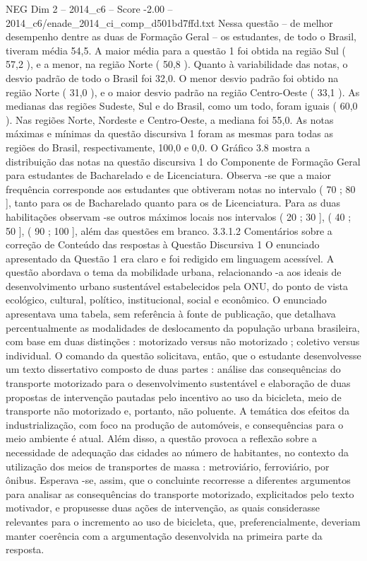 \begin{textsample}{NEG Dim 2 – 2014\_c6 – Score -2.00 – 2014\_c6/enade\_2014\_ci\_comp\_d501bd7ffd.txt}
Nessa questão – de melhor desempenho dentre as duas de Formação Geral – os estudantes, de todo o Brasil, tiveram média 54,5.
A maior média para a questão 1 foi obtida na região Sul ( 57,2 ), e a menor, na região Norte ( 50,8 ).
Quanto à variabilidade das notas, o desvio padrão de todo o Brasil foi 32,0.
O menor desvio padrão foi obtido na região Norte ( 31,0 ), e o maior desvio padrão na região Centro-Oeste ( 33,1 ).
As medianas das regiões Sudeste, Sul e do Brasil, como um todo, foram iguais ( 60,0 ).
Nas regiões Norte, Nordeste e Centro-Oeste, a mediana foi 55,0.
As notas máximas e mínimas da questão discursiva 1 foram as mesmas para todas as regiões do Brasil, respectivamente, 100,0 e 0,0.
O Gráfico 3.8 mostra a distribuição das notas na questão discursiva 1 do Componente de Formação Geral para estudantes de Bacharelado e de Licenciatura.
Observa -se que a maior frequência corresponde aos estudantes que obtiveram notas no intervalo ( 70 ; 80 ], tanto para os de Bacharelado quanto para os de Licenciatura.
Para as duas habilitações observam -se outros máximos locais nos intervalos ( 20 ; 30 ], ( 40 ; 50 ], ( 90 ; 100 ], além das questões em branco. 3.3.1.2 Comentários sobre a correção de Conteúdo das respostas à Questão Discursiva 1 O enunciado apresentado da Questão 1 era claro e foi redigido em linguagem acessível.
A questão abordava o tema da mobilidade urbana, relacionando -a aos ideais de desenvolvimento urbano sustentável estabelecidos pela ONU, do ponto de vista ecológico, cultural, político, institucional, social e econômico.
O enunciado apresentava uma tabela, sem referência à fonte de publicação, que detalhava percentualmente as modalidades de deslocamento da população urbana brasileira, com base em duas distinções : motorizado versus não motorizado ; coletivo versus individual.
O comando da questão solicitava, então, que o estudante desenvolvesse um texto dissertativo composto de duas partes : análise das consequências do transporte motorizado para o desenvolvimento sustentável e elaboração de duas propostas de intervenção pautadas pelo incentivo ao uso da bicicleta, meio de transporte não motorizado e, portanto, não poluente.
A temática dos efeitos da industrialização, com foco na produção de automóveis, e consequências para o meio ambiente é atual.
Além disso, a questão provoca a reflexão sobre a necessidade de adequação das cidades ao número de habitantes, no contexto da utilização dos meios de transportes de massa : metroviário, ferroviário, por ônibus.
Esperava -se, assim, que o concluinte recorresse a diferentes argumentos para analisar as consequências do transporte motorizado, explicitados pelo texto motivador, e propusesse duas ações de intervenção, as quais considerasse relevantes para o incremento ao uso de bicicleta, que, preferencialmente, deveriam manter coerência com a argumentação desenvolvida na primeira parte da resposta.

\end{textsample}
